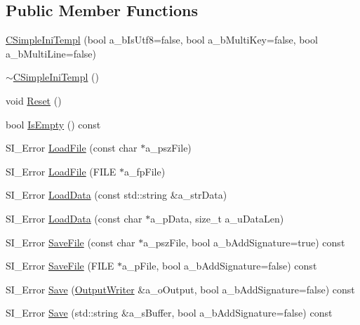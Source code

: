 \subsection*{Public Member Functions}
\begin{DoxyCompactItemize}
\item 
\hyperlink{classCSimpleIniTempl_af878d0a2aa780255b621e95f58f691d8}{C\+Simple\+Ini\+Templ} (bool a\+\_\+b\+Is\+Utf8=false, bool a\+\_\+b\+Multi\+Key=false, bool a\+\_\+b\+Multi\+Line=false)
\item 
\hyperlink{classCSimpleIniTempl_a8c933adc1d46bb663caeb6f9dee5aa12}{$\sim$\+C\+Simple\+Ini\+Templ} ()
\item 
void \hyperlink{classCSimpleIniTempl_a89b34d38be4518e9ed91c634a41b8055}{Reset} ()
\item 
bool \hyperlink{classCSimpleIniTempl_acaada2b1ab734fc7dd8780ba7f376c26}{Is\+Empty} () const 
\item 
S\+I\+\_\+\+Error \hyperlink{classCSimpleIniTempl_aebb6e5fff76efc05ca6cc4b7b56481a3}{Load\+File} (const char $\ast$a\+\_\+psz\+File)
\item 
S\+I\+\_\+\+Error \hyperlink{classCSimpleIniTempl_a7ccb65e82fa347b42b59330968f826ae}{Load\+File} (F\+I\+LE $\ast$a\+\_\+fp\+File)
\item 
S\+I\+\_\+\+Error \hyperlink{classCSimpleIniTempl_a174244fd3e09ff78da05fe46be86e714}{Load\+Data} (const std\+::string \&a\+\_\+str\+Data)
\item 
S\+I\+\_\+\+Error \hyperlink{classCSimpleIniTempl_aa797cf47cec05906f07d5065882af4d3}{Load\+Data} (const char $\ast$a\+\_\+p\+Data, size\+\_\+t a\+\_\+u\+Data\+Len)
\item 
S\+I\+\_\+\+Error \hyperlink{classCSimpleIniTempl_a1449e083d968790ef7479de24edddba0}{Save\+File} (const char $\ast$a\+\_\+psz\+File, bool a\+\_\+b\+Add\+Signature=true) const 
\item 
S\+I\+\_\+\+Error \hyperlink{classCSimpleIniTempl_af3f26b331a0f9d7f071d7b4aa8038758}{Save\+File} (F\+I\+LE $\ast$a\+\_\+p\+File, bool a\+\_\+b\+Add\+Signature=false) const 
\item 
S\+I\+\_\+\+Error \hyperlink{classCSimpleIniTempl_a5fea5d590edbb5eef694991c7c355915}{Save} (\hyperlink{classCSimpleIniTempl_1_1OutputWriter}{Output\+Writer} \&a\+\_\+o\+Output, bool a\+\_\+b\+Add\+Signature=false) const 
\item 
S\+I\+\_\+\+Error \hyperlink{classCSimpleIniTempl_af944674fb44473ede150a3bcdc103d63}{Save} (std\+::string \&a\+\_\+s\+Buffer, bool a\+\_\+b\+Add\+Signature=false) const 
\item 

\end{DoxyCompactItemize}
